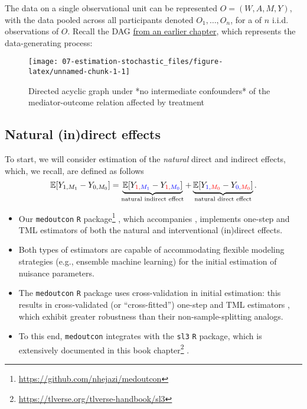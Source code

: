 \documentclass[
  12pt,
]{book}
\newcommand{\passthrough}[1]{#1}
\providecommand{\tightlist}{%
  \setlength{\itemsep}{0pt}\setlength{\parskip}{0pt}}
\renewcommand{\href}[2]{#2\footnote{\url{#1}}}
\theoremstyle{definition}
\theoremstyle{definition}
\theoremstyle{definition}
\newcommand{\E}{\mathbb{E}}
\newcommand{\1}{\mathbbm{1}}
\begin{document}
The data on a single observational unit can be represented \(O = (W, A, M, Y)\),
with the data pooled across all participants denoted \(O_1, \ldots, O_n\), for a
of \(n\) i.i.d. observations of \(O\). Recall the DAG \protect\hyperlink{estimands}{from an earlier
chapter}, which represents the data-generating process:

\begin{figure}

{\centering \texttt{[image: 07-estimation-stochastic\_files/figure-latex/unnamed-chunk-1-1]} 

}

\caption{Directed acyclic graph under *no intermediate confounders* of the mediator-outcome relation affected by treatment}\label{fig:unnamed-chunk-1}
\end{figure}

\hypertarget{natural-indirect-effects}{%
\subsection{Natural (in)direct effects}\label{natural-indirect-effects}}

To start, we will consider estimation of the \emph{natural} direct and indirect effects,
which, we recall, are defined as follows
\begin{equation*}
  \E[Y_{1,M_1} - Y_{0,M_0}] = \underbrace{\E[Y_{\color{red}{1},\color{blue}{M_1}} -
    Y_{\color{red}{1},\color{blue}{M_0}}]}_{\text{natural indirect effect}} +
    \underbrace{\E[Y_{\color{blue}{1},\color{red}{M_0}} -
    Y_{\color{blue}{0},\color{red}{M_0}}]}_{\text{natural direct effect}}.
\end{equation*}

\begin{itemize}
\tightlist
\item
  Our \href{https://github.com/nhejazi/medoutcon}{\passthrough{\lstinline!medoutcon!} \passthrough{\lstinline!R!} package}
  \citep{hejazi2021medoutcon}, which accompanies \citet{diaz2020nonparametric}, implements
  one-step and TML estimators of both the natural and interventional (in)direct
  effects.
\item
  Both types of estimators are capable of accommodating flexible modeling
  strategies (e.g., ensemble machine learning) for the initial estimation of
  nuisance parameters.
\item
  The \passthrough{\lstinline!medoutcon!} \passthrough{\lstinline!R!} package uses cross-validation in initial estimation: this
  results in cross-validated (or ``cross-fitted'') one-step and TML estimators
  \citep{klaassen1987consistent, zheng2011cross, chernozhukov2018double}, which
  exhibit greater robustness than their non-sample-splitting analogs.
\item
  To this end, \passthrough{\lstinline!medoutcon!} integrates with the \passthrough{\lstinline!sl3!} \passthrough{\lstinline!R!} package, which is
  extensively documented in this \href{https://tlverse.org/tlverse-handbook/sl3}{book
  chapter} \citep{vdl2022targeted}.
\end{itemize}
\end{document}
